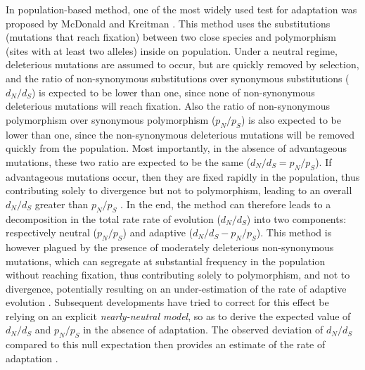 \documentclass[10pt]{article}
\begin{document}
\begin{multicols}{2}
	In population-based method, one of the most widely used test for adaptation was proposed by McDonald and Kreitman \cite{McDonald1991}. This method uses the substitutions (mutations that reach fixation) between two close species and polymorphism (sites with at least two alleles) inside on population. Under a neutral regime, deleterious mutations are assumed to occur, but are quickly removed by selection, and the ratio of non-synonymous substitutions over synonymous substitutions ($d_N/d_S$) is expected to be lower than one, since none of non-synonymous deleterious mutations will reach fixation. Also the ratio of non-synonymous polymorphism over synonymous polymorphism ($p_N/p_S$) is also expected to be lower than one, since the non-synonymous deleterious mutations will be removed quickly from the population. Most importantly, in the absence of advantageous mutations, these two ratio are expected to be the same ($d_N/d_S=p_N/p_S$). If advantageous mutations occur, then they are fixed rapidly in the population, thus contributing solely to divergence but not to polymorphism, leading to an overall $d_N/d_S$ greater than $p_N/p_S$ \cite{smith_adaptive_2002, kimura_neutral_1983}. In the end, the method can therefore leads to a decomposition in the total rate rate of evolution ($d_N/d_S$) into two components: respectively neutral ($p_N/p_S$) and adaptive ($d_N/d_S-p_N/p_S$). This method is however plagued by the presence of moderately deleterious non-synonymous mutations, which can segregate at substantial frequency in the population without reaching fixation, thus contributing solely to polymorphism, and not to divergence, potentially resulting on an under-estimation of the rate of adaptive evolution \cite{eyre-walker_quantifying_2002}. Subsequent developments have tried to correct for this effect be relying on an explicit \textit{nearly-neutral model}, so as to derive the expected value of $d_N/d_S$ and $p_N/p_S$ in the absence of adaptation. The observed deviation of $d_N/d_S$ compared to this null expectation then provides an estimate of the rate of adaptation \cite{eyre-walker_estimating_2009, galtier_adaptive_2016}. \\


\end{multicols}
\end{document}
